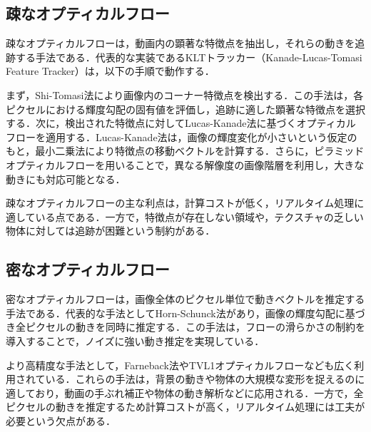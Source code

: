 \subsection{疎なオプティカルフロー}
疎なオプティカルフローは，動画内の顕著な特徴点を抽出し，それらの動きを追跡する手法である．代表的な実装であるKLTトラッカー（Kanade-Lucas-Tomasi Feature Tracker）は，以下の手順で動作する．

まず，Shi-Tomasi法\cite{shi_tomasi}により画像内のコーナー特徴点を検出する．この手法は，各ピクセルにおける輝度勾配の固有値を評価し，追跡に適した顕著な特徴点を選択する．次に，検出された特徴点に対してLucas-Kanade法\cite{lucas_kanade}に基づくオプティカルフローを適用する．Lucas-Kanade法は，画像の輝度変化が小さいという仮定のもと，最小二乗法により特徴点の移動ベクトルを計算する．さらに，ピラミッドオプティカルフローを用いることで，異なる解像度の画像階層を利用し，大きな動きにも対応可能となる．

疎なオプティカルフローの主な利点は，計算コストが低く，リアルタイム処理に適している点である．一方で，特徴点が存在しない領域や，テクスチャの乏しい物体に対しては追跡が困難という制約がある．

\newpage

\subsection{密なオプティカルフロー}
密なオプティカルフローは，画像全体のピクセル単位で動きベクトルを推定する手法である．代表的な手法としてHorn-Schunck法\cite{horn_schunck}があり，画像の輝度勾配に基づき全ピクセルの動きを同時に推定する．この手法は，フローの滑らかさの制約を導入することで，ノイズに強い動き推定を実現している．

より高精度な手法として，Farneback法\cite{farneback}やTVL1オプティカルフロー\cite{tvl1}なども広く利用されている．これらの手法は，背景の動きや物体の大規模な変形を捉えるのに適しており，動画の手ぶれ補正や物体の動き解析などに応用される．一方で，全ピクセルの動きを推定するため計算コストが高く，リアルタイム処理には工夫が必要という欠点がある．